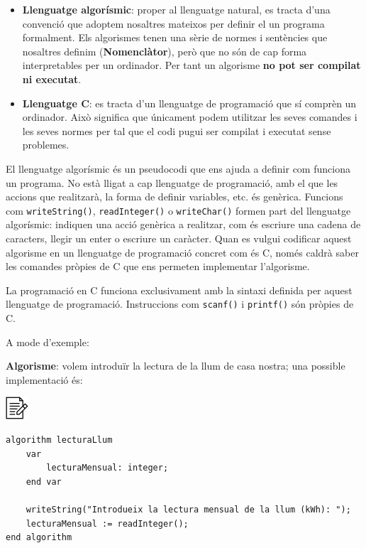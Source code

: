 \documentclass[]{book}
\providecommand{\tightlist}{%
  \setlength{\itemsep}{0pt}\setlength{\parskip}{0pt}}
\begin{document}
\begin{itemize}
\tightlist
\item
  \textbf{Llenguatge algorísmic}: proper al llenguatge natural, es
  tracta d'una convenció que adoptem nosaltres mateixos per definir el
  un programa formalment. Els algorismes tenen una sèrie de normes i
  sentències que nosaltres definim (\textbf{Nomenclàtor}), però que no
  són de cap forma interpretables per un ordinador. Per tant un
  algorisme \textbf{no pot ser compilat ni executat}.
\item
  \textbf{Llenguatge C}: es tracta d'un llenguatge de programació que sí
  comprèn un ordinador. Això significa que únicament podem utilitzar les
  seves comandes i les seves normes per tal que el codi pugui ser
  compilat i executat sense problemes.
\end{itemize}

El llenguatge algorísmic és un pseudocodi que ens ajuda a definir com
funciona un programa. No està lligat a cap llenguatge de programació,
amb el que les accions que realitzarà, la forma de definir variables,
etc. és genèrica. Funcions com \texttt{writeString()},
\texttt{readInteger()} o \texttt{writeChar()} formen part del llenguatge
algorísmic: indiquen una acció genèrica a realitzar, com és escriure una
cadena de caracters, llegir un enter o escriure un caràcter. Quan es
vulgui codificar aquest algorisme en un llenguatge de programació
concret com és C, només caldrà saber les comandes pròpies de C que ens
permeten implementar l'algorisme.

La programació en C funciona exclusivament amb la sintaxi definida per
aquest llenguatge de programació. Instruccions com \texttt{scanf()} i
\texttt{printf()} són pròpies de C.

A mode d'exemple:

\textbf{Algorisme}: volem introduïr la lectura de la llum de casa
nostra; una possible implementació és:

\includegraphics{./img/alg.png}

\begin{verbatim}
algorithm lecturaLlum
    var
        lecturaMensual: integer;
    end var

    writeString("Introdueix la lectura mensual de la llum (kWh): ");
    lecturaMensual := readInteger();
end algorithm
\end{verbatim}
\end{document}
